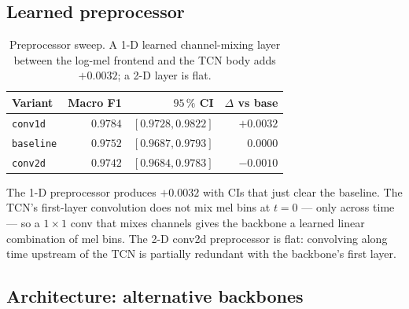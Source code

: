 \subsection{Learned preprocessor}
\label{subsec:exp_preprocessor}
\label{sec:exp_preprocessor_results}

\begin{table}[h]
\centering
\begin{tabular}{lrrr}
\toprule
\textbf{Variant} & \textbf{Macro F1} & \textbf{$95\,\%$ CI} & \textbf{$\Delta$ vs base} \\
\midrule
\texttt{conv1d}    & $\mathbf{0.9784}$ & $[0.9728, 0.9822]$ & $+0.0032$ \\
\texttt{baseline}  & $0.9752$          & $[0.9687, 0.9793]$ & $\phantom{+}0.0000$ \\
\texttt{conv2d}    & $0.9742$          & $[0.9684, 0.9783]$ & $-0.0010$ \\
\bottomrule
\end{tabular}
\caption{Preprocessor sweep. A 1-D learned channel-mixing layer between the log-mel frontend and the TCN body adds $+0.0032$; a 2-D layer is flat.}
\label{tab:preprocessor_results}
\end{table}

The 1-D preprocessor produces $+0.0032$ with CIs that just clear the baseline.
The TCN's first-layer convolution does not mix mel bins at $t = 0$ — only across time — so a $1\times 1$ conv that mixes channels gives the backbone a learned linear combination of mel bins.
The 2-D conv2d preprocessor is flat: convolving along time upstream of the TCN is partially redundant with the backbone's first layer.

\subsection{Architecture: alternative backbones}
\label{subsec:exp_architecture}

